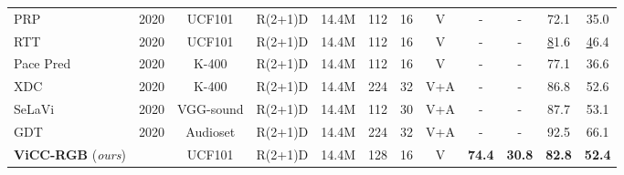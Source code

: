 \documentclass[10pt,twocolumn,letterpaper]{article}
\newcommand\Tstrut{\rule{0pt}{2.2ex}}         \newcommand\Bstrut{\rule[-0.9ex]{0pt}{0pt}}   \usepackage{booktabs}
\begin{document}
\begin{table*}
\begin{center}
{\begin{tabular}{lccccccccccc}
PRP \cite{yao_video_2020}   				& 2020                        & UCF101                         & R(2+1)D                         & 14.4M                        & 112                        & 16                        & V      &	-	 &    -      & 72.1                        & 35.0                        \\
RTT \cite{jenni_video_2020}  				& 2020                        & UCF101                         & R(2+1)D                         & 14.4M                        & 112                        & 16                        & V       &	-	 &   -       & {\ul 81.6}                        & {\ul 46.4}                        \\
{\color[HTML]{9B9B9B} Pace Pred \cite{wang_self-supervised_2020}}   & {\color[HTML]{9B9B9B} 2020} & {\color[HTML]{9B9B9B} K-400} & {\color[HTML]{9B9B9B} R(2+1)D}  & {\color[HTML]{9B9B9B} 14.4M} & {\color[HTML]{9B9B9B} 112} & {\color[HTML]{9B9B9B} 16} & {\color[HTML]{9B9B9B} V}  &	-	 &        -   & {\color[HTML]{9B9B9B} 77.1} & {\color[HTML]{9B9B9B} 36.6} \\
{\color[HTML]{9B9B9B} XDC \cite{alwassel_self-supervised_2020}}     & {\color[HTML]{9B9B9B} 2020} & {\color[HTML]{9B9B9B} K-400} & {\color[HTML]{9B9B9B} R(2+1)D}  & {\color[HTML]{9B9B9B} 14.4M} & {\color[HTML]{9B9B9B} 224} & {\color[HTML]{9B9B9B} 32} & {\color[HTML]{9B9B9B} V+A} &	-	 &      -    & {\color[HTML]{9B9B9B} 86.8} & {\color[HTML]{9B9B9B} 52.6} \\
{\color[HTML]{9B9B9B} SeLaVi \cite{asano_labelling_2020}}      		& {\color[HTML]{9B9B9B} 2020} & {\color[HTML]{9B9B9B} VGG-sound \cite{chen_vggsound_2020}} & {\color[HTML]{9B9B9B} R(2+1)D}  & {\color[HTML]{9B9B9B} 14.4M} & {\color[HTML]{9B9B9B} 112} & {\color[HTML]{9B9B9B} 30} & {\color[HTML]{9B9B9B} V+A} &	-	 &    -      & {\color[HTML]{9B9B9B} 87.7} & {\color[HTML]{9B9B9B} 53.1} \\ 
{\color[HTML]{9B9B9B} GDT \cite{patrick_multi-modal_2020}}       									& {\color[HTML]{9B9B9B} 2020} & {\color[HTML]{9B9B9B} Audioset \cite{gemmeke_audio_2017}} & {\color[HTML]{9B9B9B} R(2+1)D}  & {\color[HTML]{9B9B9B} 14.4M} & {\color[HTML]{9B9B9B} 224} & {\color[HTML]{9B9B9B} 32} & {\color[HTML]{9B9B9B} V+A} &	-	 &     -      & {\color[HTML]{9B9B9B} 92.5} & {\color[HTML]{9B9B9B} 66.1} \\\hline \Tstrut
\textbf{ViCC-RGB} (\textit{ours})                			&                             & UCF101                         & R(2+1)D                         & 14.4M                        & 128                        & 16 
& V                        &	\textbf{74.4}	 &  \textbf{30.8}    	      	& \textbf{82.8}               &              \textbf{52.4}               \\ 

\end{tabular}}
\end{center}
\end{table*}
\end{document}

